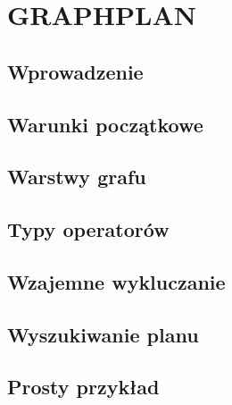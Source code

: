 \chapter{GRAPHPLAN}
\thispagestyle{chapterBeginStyle}

\section{Wprowadzenie}

\section{Warunki początkowe}

\section{Warstwy grafu}

\section{Typy operatorów}

\section{Wzajemne wykluczanie}

\section{Wyszukiwanie planu}

\section{Prosty przykład}
